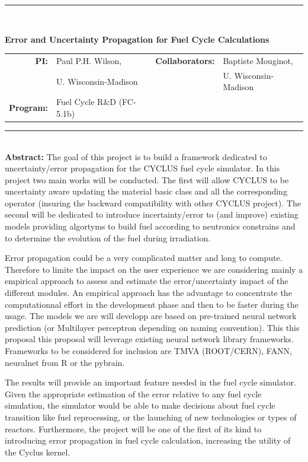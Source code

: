 \documentclass[dvips,12pt]{article}
\begin{document}
\vspace*{0.5in}

\noindent\rule{\textwidth}{1pt}\

\vspace*{0.2in}

\begin{centering}
  \textbf{\large Error and Uncertainty Propagation for Fuel Cycle Calculations}\\
\end{centering}

\vspace*{0.25in}

\noindent
\begin{tabularx}{\textwidth}{rlrl}
   \textbf{PI:} & Paul P.H. Wilson, & 
         \textbf{Collaborators:} & Baptiste Mouginot, \\
                & U. Wisconsin-Madison & 
         & U. Wisconsin-Madison \\
   \textbf{Program:} & Fuel Cycle R\&D (FC-5.1b) & &
\end{tabularx}



\vspace{0.2in}
\noindent\rule{\textwidth}{1pt}\\

\noindent\textbf{Abstract:} 
The goal of this project is to build a framework
dedicated to uncertainty/error propagation for the
CYCLUS fuel cycle simulator. In this project two
main works will be conducted. The first will allow
CYCLUS to be uncertainty aware updating the
material basic class and all the corresponding
operator (insuring the backward compatibility with
other CYCLUS project). The second will be
dedicated to introduce incertainty/error to (and
improve) existing models providing algortyms to
build fuel according to neutronics constrains and
to determine the evolution of the fuel during
irradiation.

Error propagation could be a very complicated
matter and long to compute. Therefore to limite
the impact on the user experience we are
considering mainly a empirical approach to assess
and estimate the error/uncertainty impact of the
different modules. An empirical approach has the
advantage to concentrate the computationnal effort
in the development phase and then to be faster
during the usage. The models we are will developp
are based on pre-trained neural network prediction
(or Multilayer perceptron depending on naming
convention). This this proposal this proposal will
leverage existing neural network library
frameworks. Frameworks to be considered for
inclusion are TMVA (ROOT/CERN), FANN, neuralnet
from R or the pybrain.

The results will provide an important feature
needed in the fuel cycle simulator. Given the
appropriate estimation of the error relative to
any fuel cycle simulation, the simulator would be
able to make decisions about fuel cycle transition
like fuel reprocessing, or the launching of new
technologies or types of reactors. Furthermore,
the project will be one of the first of its kind
to introducing error propagation in fuel cycle
calculation, increasing the utility of the Cyclus
kernel.
\end{document}
